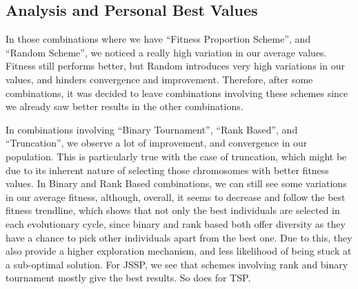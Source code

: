 \documentclass{article}
\theoremstyle{mytheoremstyle}
\theoremstyle{mytheoremstyle}
\theoremstyle{myproblemstyle}
\begin{document}

\subsection{Analysis and Personal Best Values}
In those combinations where we have ``Fitness Proportion Scheme'', and ``Random Scheme'', we noticed a really high variation in our average values. Fitness still performs better, but Random introduces very high variations in our values, and hinders convergence and improvement. Therefore, after some combinations, it was decided to leave combinations involving these schemes since we already saw better results in the other combinations.

In combinations involving ``Binary Tournament'', ``Rank Based'', and ``Truncation'', we observe a lot of improvement, and convergence in our population. This is particularly true with the case of truncation, which might be due to its inherent nature of selecting those chromosomes with better fitness values. In Binary and Rank Based combinations, we can still see some variations in our average fitness, although, overall, it seems to decrease and follow the best fitness trendline, which shows that not only the best individuals are selected in each evolutionary cycle, since binary and rank based both offer diversity as they have a chance to pick other individuals apart from the best one. Due to this, they also provide a higher exploration mechanism, and less likelihood of being stuck at a sub-optimal solution. For JSSP, we see that schemes involving rank and binary tournament mostly give the best results. So does for TSP.
\end{document}
